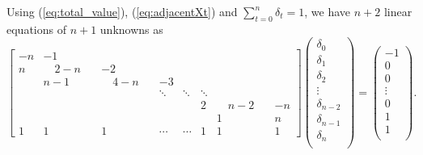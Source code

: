 \documentclass[a4paper,12pt]{article}
\begin{document}
Using (\ref{eq:total_value}), (\ref{eq:adjacentXt}) and $\sum\limits_{t=0}^n \delta_t=1$, we have $n+2$ linear equations of $n+1$ unknowns as
$$
\left [ 
\begin{array}{cccccccccc}
-n&-1            &              &      &      &      &              &  \\
n &\quad 2-n\quad&-2            &      &      &      &              &  \\
  &n-1           &\quad 4-n\quad&-3    &      &      &              &  \\
  &              &              &\ddots&\ddots&\ddots&              &  \\
  &              &              &      &      &2     &\quad n-2\quad&-n\\
  &              &              &      &      &      &1             &n \\
1 &1             &1             &\cdots&\cdots&1     &1             &1
\end{array}
\right ] 
\left (
\begin{array}{c}
\delta_0 	\\
\delta_1 	\\
\delta_2 	\\
\vdots \\
\delta_{n-2} \\
\delta_{n-1} \\
\delta_n \\
\end{array}
\right )
= 
\left (
\begin{array}{c}
-1 \\
0 \\
0 \\
\vdots \\
0 \\
1 \\
1 \\
\end{array}
\right ).
$$
\end{document}
